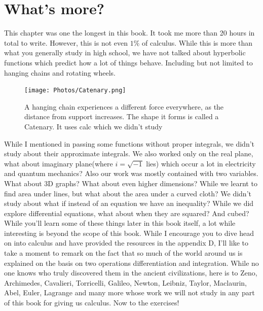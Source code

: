\section{What's more?}
This chapter was one the longest in this book. It took me more than 20 hours in total to write. However, this is not even $1\%$ of calculus. While this is more than what you generally study in high school, we have not talked about hyperbolic functions which predict how a lot of things behave.  Including but not limited to hanging chains and rotating wheels.
\begin{figure} [H]
    \centering
    \texttt{[image: Photos/Catenary.png]}
    \caption{A hanging chain experiences a different force everywhere, as the distance from support increases. The shape it forms is called a Catenary. It uses calc which we didn't study}
    
\end{figure}
While I mentioned in passing some functions without proper integrals, we didn't study about their approximate integrals. We also worked only on the real plane, what about imaginary plane(where $i=\sqrt{-1}$ lies) which occur a lot in electricity and quantum mechanics? Also our work was mostly contained with two variables. What about 3D graphs? What about even higher dimensions? While we learnt to find area under lines, but what about the area under a curved cloth? We didn't study about what if instead of an equation we have an inequality? While we did explore differential equations, what about when they are squared? And cubed? While you'll learn some of these things later in this book itself, a lot while interesting is beyond the scope of this book. While I encourage you to dive head on into calculus and have provided the resources in the appendix D, I'll like to take a moment to remark on the fact that so much of the world around us is explained on the basis on two operations differentiation and integration. While no one knows who truly discovered them in the ancient civilizations, here is to Zeno, Archimedes, Cavalieri, Torricelli, Galileo, Newton, Leibniz, Taylor, Maclaurin, Abel, Euler,  Lagrange and many more whose work we will not study in any part of this book for giving us calculus. Now to the exercises!
